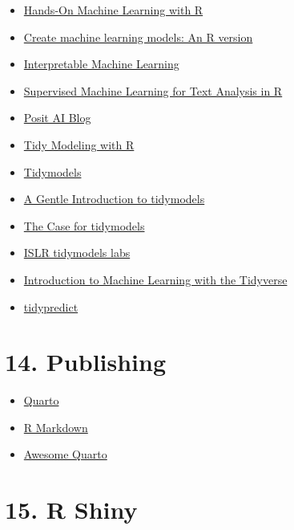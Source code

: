 \documentclass[
  letterpaper,
  DIV=11,
  numbers=noendperiod]{scrreprt}
\providecommand{\tightlist}{%
  \setlength{\itemsep}{0pt}\setlength{\parskip}{0pt}}\usepackage{longtable,booktabs,array}
\begin{document}
\begin{itemize}
\tightlist
\item
  \href{https://bradleyboehmke.github.io/HOML/}{Hands-On Machine
  Learning with R}
\item
  \href{https://rpubs.com/eR_ic/exploRe}{Create machine learning models:
  An R version}
\item
  \href{https://advanced-ds-in-r.netlify.app/posts/2021-03-31-imllocal/}{Interpretable
  Machine Learning}
\item
  \href{https://smltar.com/}{Supervised Machine Learning for Text
  Analysis in R}
\item
  \href{https://blogs.rstudio.com/ai/}{Posit AI Blog}
\item
  \href{https://www.tmwr.org/}{Tidy Modeling with R}
\item
  \href{https://www.tidymodels.org/}{Tidymodels}
\item
  \href{https://rviews.rstudio.com/2019/06/19/a-gentle-intro-to-tidymodels/}{A
  Gentle Introduction to tidymodels}
\item
  \href{https://rviews.rstudio.com/2020/04/21/the-case-for-tidymodels/}{The
  Case for tidymodels}
\item
  \href{https://emilhvitfeldt.github.io/ISLR-tidymodels-labs/index.html}{ISLR
  tidymodels labs}
\item
  \href{https://education.rstudio.com/blog/2020/02/conf20-intro-ml/}{Introduction
  to Machine Learning with the Tidyverse}
\item
  \href{https://tidypredict.tidymodels.org/}{tidypredict}
\end{itemize}

\hypertarget{publishing}{%
\section*{14. Publishing}\label{publishing}}


\begin{itemize}
\tightlist
\item
  \href{https://quarto.org/}{Quarto}
\item
  \href{https://rmarkdown.rstudio.com/}{R Markdown}
\item
  \href{https://github.com/mcanouil/awesome-quarto}{Awesome Quarto}
\end{itemize}

\hypertarget{r-shiny}{%
\section*{15. R Shiny}\label{r-shiny}}
\end{document}

